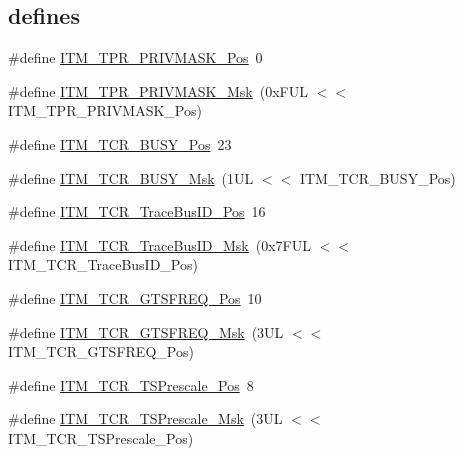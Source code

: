 \subsection*{\textquotesingle{}defines\textquotesingle{}}
\begin{DoxyCompactItemize}
\item 
\#define \hyperlink{group___c_m_s_i_s___i_t_m_ga7abe5e590d1611599df87a1884a352e8}{I\+T\+M\+\_\+\+T\+P\+R\+\_\+\+P\+R\+I\+V\+M\+A\+S\+K\+\_\+\+Pos}~0
\item 
\#define \hyperlink{group___c_m_s_i_s___i_t_m_ga168e089d882df325a387aab3a802a46b}{I\+T\+M\+\_\+\+T\+P\+R\+\_\+\+P\+R\+I\+V\+M\+A\+S\+K\+\_\+\+Msk}~(0x\+F\+U\+L $<$$<$ I\+T\+M\+\_\+\+T\+P\+R\+\_\+\+P\+R\+I\+V\+M\+A\+S\+K\+\_\+\+Pos)
\item 
\#define \hyperlink{group___c_m_s_i_s___i_t_m_ga9174ad4a36052c377cef4e6aba2ed484}{I\+T\+M\+\_\+\+T\+C\+R\+\_\+\+B\+U\+S\+Y\+\_\+\+Pos}~23
\item 
\#define \hyperlink{group___c_m_s_i_s___i_t_m_ga43ad7cf33de12f2ef3a412d4f354c60f}{I\+T\+M\+\_\+\+T\+C\+R\+\_\+\+B\+U\+S\+Y\+\_\+\+Msk}~(1\+U\+L $<$$<$ I\+T\+M\+\_\+\+T\+C\+R\+\_\+\+B\+U\+S\+Y\+\_\+\+Pos)
\item 
\#define \hyperlink{group___c_m_s_i_s___i_t_m_gaca0281de867f33114aac0636f7ce65d3}{I\+T\+M\+\_\+\+T\+C\+R\+\_\+\+Trace\+Bus\+I\+D\+\_\+\+Pos}~16
\item 
\#define \hyperlink{group___c_m_s_i_s___i_t_m_ga60c20bd9649d1da5a2be8e656ba19a60}{I\+T\+M\+\_\+\+T\+C\+R\+\_\+\+Trace\+Bus\+I\+D\+\_\+\+Msk}~(0x7\+F\+U\+L $<$$<$ I\+T\+M\+\_\+\+T\+C\+R\+\_\+\+Trace\+Bus\+I\+D\+\_\+\+Pos)
\item 
\#define \hyperlink{group___c_m_s_i_s___i_t_m_ga96c7c7cbc0d98426c408090b41f583f1}{I\+T\+M\+\_\+\+T\+C\+R\+\_\+\+G\+T\+S\+F\+R\+E\+Q\+\_\+\+Pos}~10
\item 
\#define \hyperlink{group___c_m_s_i_s___i_t_m_gade862cf009827f7f6748fc44c541b067}{I\+T\+M\+\_\+\+T\+C\+R\+\_\+\+G\+T\+S\+F\+R\+E\+Q\+\_\+\+Msk}~(3\+U\+L $<$$<$ I\+T\+M\+\_\+\+T\+C\+R\+\_\+\+G\+T\+S\+F\+R\+E\+Q\+\_\+\+Pos)
\item 
\#define \hyperlink{group___c_m_s_i_s___i_t_m_gad7bc9ee1732032c6e0de035f0978e473}{I\+T\+M\+\_\+\+T\+C\+R\+\_\+\+T\+S\+Prescale\+\_\+\+Pos}~8
\item 
\#define \hyperlink{group___c_m_s_i_s___i_t_m_ga7a723f71bfb0204c264d8dbe8cc7ae52}{I\+T\+M\+\_\+\+T\+C\+R\+\_\+\+T\+S\+Prescale\+\_\+\+Msk}~(3\+U\+L $<$$<$ I\+T\+M\+\_\+\+T\+C\+R\+\_\+\+T\+S\+Prescale\+\_\+\+Pos)
\item 
$$
\end{DoxyCompactItemize}
